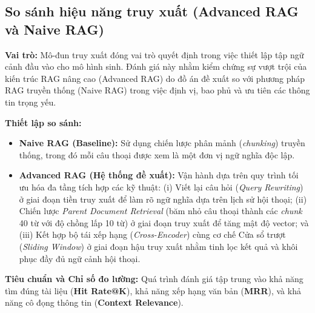 \subsection{So sánh hiệu năng truy xuất (Advanced RAG và Naive RAG)}

\textbf{Vai trò:}
Mô-đun truy xuất đóng vai trò quyết định trong việc thiết lập tập ngữ cảnh đầu vào cho mô hình sinh. Đánh giá này nhằm kiểm chứng sự vượt trội của kiến trúc RAG nâng cao (Advanced RAG) do đồ án đề xuất so với phương pháp RAG truyền thống (Naive RAG) trong việc định vị, bao phủ và ưu tiên các thông tin trọng yếu.

\textbf{Thiết lập so sánh:}
\begin{itemize}[leftmargin=*, label={}]
    \item \textbf{Naive RAG (Baseline):} Sử dụng chiến lược phân mảnh (\textit{chunking}) truyền thống, trong đó mỗi câu thoại được xem là một đơn vị ngữ nghĩa độc lập.
    \item \textbf{Advanced RAG (Hệ thống đề xuất):} Vận hành dựa trên quy trình tối ưu hóa đa tầng tích hợp các kỹ thuật: (i) Viết lại câu hỏi (\textit{Query Rewriting}) ở giai đoạn tiền truy xuất để làm rõ ngữ nghĩa dựa trên lịch sử hội thoại; (ii) Chiến lược \textit{Parent Document Retrieval} (băm nhỏ câu thoại thành các \textit{chunk} 40 từ với độ chồng lấp 10 từ) ở giai đoạn truy xuất để tăng mật độ vector; và (iii) Kết hợp bộ tái xếp hạng (\textit{Cross-Encoder}) cùng cơ chế Cửa sổ trượt (\textit{Sliding Window}) ở giai đoạn hậu truy xuất nhằm tinh lọc kết quả và khôi phục đầy đủ ngữ cảnh hội thoại.
\end{itemize}

\textbf{Tiêu chuẩn và Chỉ số đo lường:} 
Quá trình đánh giá tập trung vào khả năng tìm đúng tài liệu (\textbf{Hit Rate@K}), khả năng xếp hạng văn bản (\textbf{MRR}), và khả năng cô đọng thông tin (\textbf{Context Relevance}).


